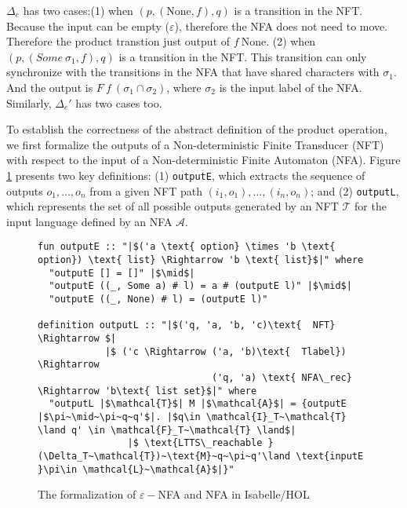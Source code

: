 \documentclass[a4paper,UKenglish,cleveref, autoref, thm-restate]{lipics-v2021}
\begin{document}
$\Delta_e$ has two cases:(1) when $(p, (\text{None}, f),  q)$ is a transition in the NFT. Because the input can be empty ($\varepsilon$), therefore the NFA does not need to move. Therefore the product transtion just output of $f~\text{None}$. (2) when $(p, (Some~\sigma_1, f), q)$ is a transition in the NFT. This transition can only synchronize with the transitions in the NFA that have shared characters with $\sigma_1$. And the output is $F~f~(\sigma_1\cap\sigma_2)$, where $\sigma_2$ is the input label of the NFA. Similarly, $\Delta_e'$ has two cases too.


To establish the correctness of the abstract definition of the product operation, we first formalize the outputs of a Non-deterministic Finite Transducer (NFT) with respect to the input of a Non-deterministic Finite Automaton (NFA). Figure \ref{fig-def-output} presents two key definitions: (1) \texttt{outputE}, which extracts the sequence of outputs $o_1, \ldots, o_n$ from a given NFT path $(i_1, o_1), \ldots, (i_n, o_n)$; and (2) \texttt{outputL}, which represents the set of all possible outputs generated by an NFT $\mathcal{T}$ for the input language defined by an NFA $\mathcal{A}$.


\begin{figure}[hbt!]
	\begin{lstlisting}
fun outputE :: "|$('a \text{ option} \times 'b \text{ option}) \text{ list} \Rightarrow 'b \text{ list}$|" where
  "outputE [] = []" |$\mid$|
  "outputE ((_, Some a) # l) = a # (outputE l)" |$\mid$|
  "outputE ((_, None) # l) = (outputE l)"

definition outputL :: "|$('q, 'a, 'b, 'c)\text{  NFT} \Rightarrow $|
            |$ ('c \Rightarrow ('a, 'b)\text{  Tlabel}) \Rightarrow 
                               ('q, 'a) \text{ NFA\_rec} \Rightarrow 'b\text{ list set}$|" where
  "outputL |$\mathcal{T}$| M |$\mathcal{A}$| = {outputE |$\pi~\mid~\pi~q~q'$|. |$q\in \mathcal{I}_T~\mathcal{T} \land q' \in \mathcal{F}_T~\mathcal{T} \land$|
                |$ \text{LTTS\_reachable }(\Delta_T~\mathcal{T})~\text{M}~q~\pi~q'\land \text{inputE }\pi\in \mathcal{L}~\mathcal{A}$|}" 
	\end{lstlisting}
\caption{The formalization of $\varepsilon-$NFA and NFA in Isabelle/HOL}
\label{fig-def-output}
\end{figure}
\end{document}

